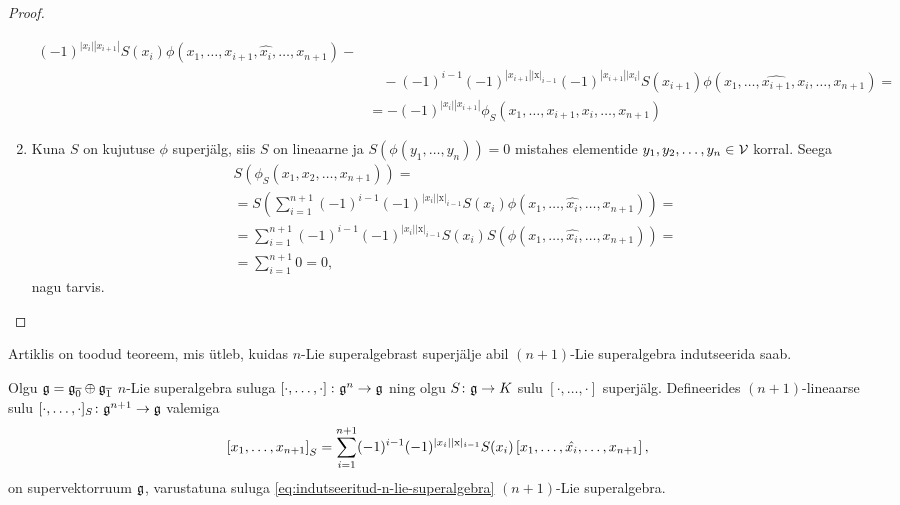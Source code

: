 \begin{proof}
\begin{enumerate}[label=\arabic*)]
\begin{align*}
{                    } (-1)^{|x_i||x_{i+1}|}
                    S(x_i) \phi(
                        x_1, \dots, x_{i+1}, \hat{x_i}, \dots, x_{n+1}
                    ) - \\
                &\quad
                    -(-1)^{i-1} (-1)^{|x_{i+1}||\mathrm{x}|_{i-1}}
                    (-1)^{|x_{i+1}||x_i|}
                    S(x_{i+1}) \phi(
                        x_1, \dots, \hat{x_{i+1}}, x_i, \dots, x_{n+1}
                    ) = \\
                &= -(-1)^{|x_i||x_{i+1}|} \phi_S(
                    x_1, \dots, x_{i+1}, x_i, \dots, x_{n+1}
                )
            \end{align*}

        \item Kuna $S$ on kujutuse $\phi$ superjälg, siis $S$ on
            lineaarne ja $S(\phi(y_1, \dots, y_n)) = 0$ mistahes
            elementide $y_1, y_2, \dots, y_n \in \mathcal{V}$ korral. Seega
            \begin{align*}
                & S\left(\phi_S(x_1, x_2, \dots, x_{n+1})\right) = \\
                &= S\left( \sum_{i=1}^{n+1}
                    (-1)^{i-1} (-1)^{|x_i||\mathrm{x}|_{i-1}}
                    S(x_i) \phi(
                        x_1, \dots, \hat{x_i}, \dots, x_{n+1}
                    )
                    \right) = \\
                &= \sum_{i=1}^{n+1}
                    (-1)^{i-1} (-1)^{|x_i||\mathrm{x}|_{i-1}}
                    S(x_i) S(\phi(
                        x_1, \dots, \hat{x_i}, \dots, x_{n+1}
                    )) = \\
                &= \sum_{i=1}^{n+1} 0 = 0,
            \end{align*}
            nagu tarvis. \qedhere
    \end{enumerate}
\end{proof}

Artiklis \cite{Abramov:2014} on toodud teoreem, mis ütleb, kuidas
$n$-Lie superalgebrast superjälje abil $(n+1)$-Lie superalgebra
indutseerida saab.

\begin{thm}
    Olgu $\mathfrak{g} = \mathfrak{g}_{\overline{0}} \oplus \mathfrak{g}_{\overline{1}}$
    $n$-Lie superalgebra suluga
    $\left[ \cdot, \dots, \cdot \right] \colon \mathfrak{g}^n \to \mathfrak{g}$ ning olgu
    $S \colon \mathfrak{g} \to K$ sulu $[\cdot, \dots, \cdot]$ superjälg.
    Defineerides $(n+1)$-lineaarse sulu
    $[\cdot, \dots, \cdot]_S \colon \mathfrak{g}^{n+1} \to \mathfrak{g}$ valemiga
    \begin{align}\label{eq:indutseeritud-n-lie-superalgebra}
        \left[ x_1, \dots, x_{n+1} \right]_S = \sum_{i=1}^{n+1}
        (-1)^{i-1} (-1)^{|x_i| |\mathrm{x}|_{i-1}} S(x_i)
        \left[ x_1, \dots, \hat{x_i}, \dots, x_{n+1} \right],
    \end{align}
    on supervektorruum $\mathfrak{g}$, varustatuna suluga
    \eqref{eq:indutseeritud-n-lie-superalgebra} $(n+1)$-Lie
    superalgebra.
\end{thm}

